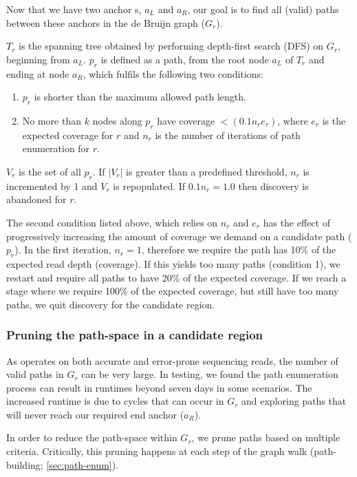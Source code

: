 Now that we have two anchor \kmer{}s, $a_L$ and $a_R$, our goal is to find all (valid) paths between these anchors in the de Bruijn graph ($G_r$).

$T_r$ is the spanning tree obtained by performing depth-first search (DFS) on $G_r$, beginning from $a_L$. $p_r$ is defined as a path, from the root node $a_L$ of $T_r$ and ending at node $a_R$, which fulfils the following two conditions:

\begin{enumerate}
  \item $p_r$ is shorter than the maximum allowed path length.
  \item No more than $k$ nodes along $p_r$ have coverage $< (0.1 n_r e_r)$, where $e_r$ is the expected \kmer{} coverage for $r$ and $n_r$ is the number of iterations of path enumeration for $r$.
\end{enumerate}

$V_r$ is the set of all $p_r$. If $|V_r|$ is greater than a predefined threshold, $n_r$ is incremented by 1 and $V_r$ is repopulated. If $0.1n_r = 1.0$ then \denovo{} discovery is abandoned for $r$.

The second condition listed above, which relies on $n_r$ and $e_r$ has the effect of progressively increasing the amount of coverage we demand on a candidate path ($p_r$). In the first iteration, $n_r=1$, therefore we require the path has 10\% of the expected read depth (coverage). If this yields too many paths (condition 1), we restart and require all paths to have 20\% of the expected coverage. If we reach a stage where we require 100\% of the expected coverage, but still have too many paths, we quit \denovo{} discovery for the candidate region.

\subsubsection{Pruning the path-space in a candidate region}
\label{sec:denovo-prune}

As \pandora{} operates on both accurate and error-prone sequencing reads, the number of valid paths in $G_r$ can be very large. In testing, we found the path enumeration process can result in runtimes beyond seven days in some scenarios. The increased runtime is due to cycles that can occur in $G_r$ and exploring paths that will never reach our required end anchor ($a_R$). 

In order to reduce the path-space within $G_r$, we prune paths based on multiple criteria. Critically, this pruning happens at each step of the graph walk (path-building; \autoref{sec:path-enum}).

